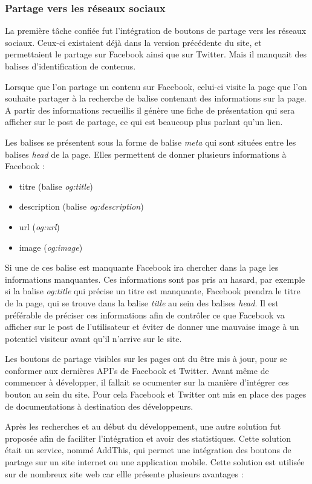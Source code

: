 \documentclass[12pt,a4paper]{article}
\begin{document}
\subsubsection{Partage vers les réseaux sociaux}
La première tâche confiée fut l'intégration de boutons de partage vers les réseaux sociaux. Ceux-ci existaient déjà dans la version précédente du site, et permettaient le partage sur Facebook ainsi que sur Twitter. Mais il manquait des balises d'identification de contenus.\par 
Lorsque que l'on partage un contenu sur Facebook, celui-ci visite la page que l'on souhaite partager à la recherche de balise contenant des informations sur la page. A partir des informations recueillis il génère une fiche de présentation qui sera afficher sur le post de partage, ce qui est beaucoup plus parlant qu'un lien.\par
Les balises se présentent sous la forme de balise \textit{meta} qui sont situées entre les balises \textit{head} de la page. Elles permettent de donner plusieurs informations à Facebook :
\begin{itemize}
\item titre (balise \textit{og:title})
\item description (balise \textit{og:description})
\item url (\textit{og:url})
\item image (\textit{og:image})
\end{itemize}
Si une de ces balise est manquante Facebook ira chercher dans la page les informations manquantes. Ces informations sont pas pris au hasard, par exemple si la balise \textit{og:title} qui précise un titre est manquante, Facebook prendra le titre de la page, qui se trouve dans la balise \textit{title} au sein des balises \textit{head}. Il est préférable de préciser ces informations afin de contrôler ce que Facebook va afficher sur le post de l'utilisateur et éviter de donner une mauvaise image à un potentiel visiteur avant qu'il n'arrive sur le site.\par
\bigskip
Les boutons de partage visibles sur les pages ont du être mis à jour, pour se conformer aux dernières API's de Facebook et Twitter. Avant même de commencer à développer, il fallait se ocumenter sur la manière d'intégrer ces bouton au sein du site. Pour cela Facebook et Twitter ont mis en place des pages de documentations à destination des développeurs. \par 
Après les recherches et au début du développement, une autre solution fut proposée afin de faciliter l'intégration et avoir des statistiques. Cette solution était un service, nommé AddThis, qui permet une intégration des boutons de partage sur un site internet ou une application mobile. Cette solution est utilisée sur de nombreux site web car ellle présente plusieurs avantages : 
\end{document}
